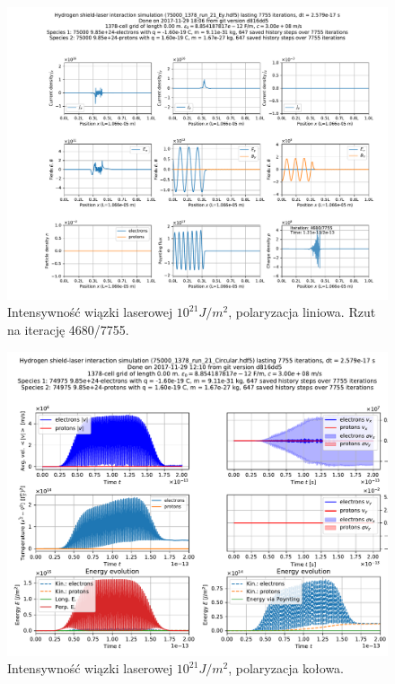 \begin{figure}[h!]
  \includegraphics[width=\textwidth]{Images/75000_1378_run_21_Ey_004680}
  \caption{Intensywność wiązki laserowej $10^{21} J/m^2$, polaryzacja liniowa. Rzut na iterację 4680/7755.\label{fig:laser-21-Ey-snapshot}}
\end{figure}

\begin{figure}[h!]
  \includegraphics[width=\textwidth]{Images/75000_1378_run_21_Circular}
  \caption{Intensywność wiązki laserowej $10^{21} J/m^2$, polaryzacja kołowa.\label{fig:laser-21-Circular}}
\end{figure}

